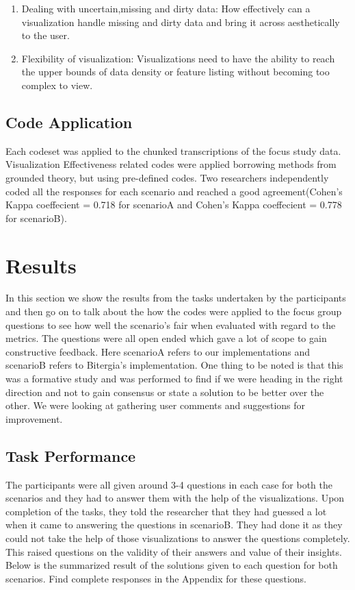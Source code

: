 \documentclass[seploa]{beavtex}
\begin{document}
\begin{enumerate}
\item Dealing with uncertain,missing and dirty data: How effectively can a visualization handle missing and dirty data and bring it across aesthetically to the user\cite{grins2001}.

\item Flexibility of visualization: Visualizations need to have the ability to reach the upper bounds of data density or feature listing without becoming too complex to view\cite{grins2001}.
\end{enumerate}

\section{Code Application}
Each codeset was applied to the chunked transcriptions of the focus study data. Visualization Effectiveness related  codes  were  applied borrowing methods from  grounded theory\cite{corbin2008}, but using pre-­defined codes. Two researchers independently coded all the responses for each scenario and reached a good agreement(Cohen’s  Kappa  coeffecient  =  0.718 for scenarioA and Cohen’s  Kappa  coeffecient  =  0.778 for scenarioB).

\chapter{Results}
In this section we show the results from the tasks undertaken by the participants and then go on to talk about the how the codes were applied to the focus group questions to see how well the scenario's fair when evaluated with regard to the metrics. The questions were all open ended which gave a lot of scope to gain constructive feedback. Here scenarioA refers to our implementations and scenarioB refers to Bitergia's implementation. One thing to be noted is that this was a formative study and was performed to find if we were heading in the right direction and not to gain consensus or state a solution to be better over the other. We were looking at gathering user comments and suggestions for improvement.

\section{Task Performance}
The participants were all given around 3-4 questions in each case for both the scenarios and they had to answer them with the help of the visualizations. Upon completion of the tasks, they told the researcher that they had guessed a lot when it came to answering the questions in scenarioB. They had done it as they could not take the help of those visualizations to answer the questions completely. This raised questions on the validity of their answers and value of their insights. Below is the summarized result of the solutions given to each question for both scenarios. Find complete responses in the Appendix for these questions.
\end{document}
